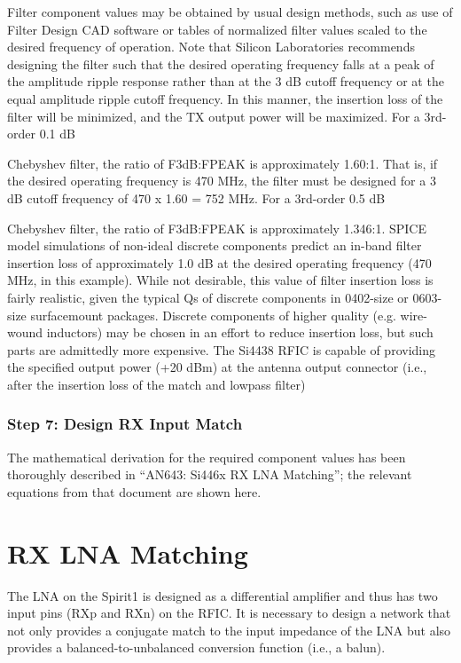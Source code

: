         Filter component values may be obtained by usual design methods, such as use of Filter 
        Design CAD software or tables of normalized filter values scaled to the desired frequency 
        of operation. Note that Silicon Laboratories recommends designing the filter such that the 
        desired operating frequency falls at a peak of the amplitude ripple response rather than at 
        the 3 dB cutoff frequency or at the equal amplitude ripple cutoff frequency. In this 
        manner, the insertion loss of the filter will be minimized, and the TX output power will be 
        maximized. For a 3rd-order 0.1 dB
        
        Chebyshev filter, the ratio of F3dB:FPEAK is approximately 1.60:1. That is, if the desired 
        operating frequency is 470 MHz, the filter must be designed for a 3 dB cutoff frequency of 
        470 x 1.60 = 752 MHz. For a 3rd-order 0.5 dB
        
        Chebyshev filter, the ratio of F3dB:FPEAK is approximately 1.346:1. SPICE model simulations 
        of non-ideal discrete components predict an in-band filter insertion loss of approximately 
        1.0 dB at the desired operating frequency (470 MHz, in this example). While not desirable, 
        this value of filter insertion loss is fairly realistic, given the typical Qs of discrete 
        components in 0402-size or 0603-size surfacemount packages. Discrete components of higher 
        quality (e.g. wire-wound inductors) may be chosen in an effort to reduce insertion loss, 
        but such parts are admittedly more expensive. The Si4438 RFIC is capable of providing the 
        specified output power (+20 dBm) at the antenna output connector (i.e., after the insertion 
        loss of the match and lowpass filter)
        
      \subsubsection{Step 7: Design RX Input Match}
        The mathematical derivation for the required component values has been thoroughly described 
        in “AN643: Si446x RX LNA Matching”; the relevant equations from that document are shown 
        here.
   
  \section{RX LNA Matching}
    The LNA on the Spirit1 is designed as a differential amplifier and thus has two input pins (RXp 
    and RXn) on the RFIC. It is necessary to design a network that not only provides a conjugate 
    match to the input impedance of the LNA but also provides a balanced-to-unbalanced conversion 
    function (i.e., a balun).
    
